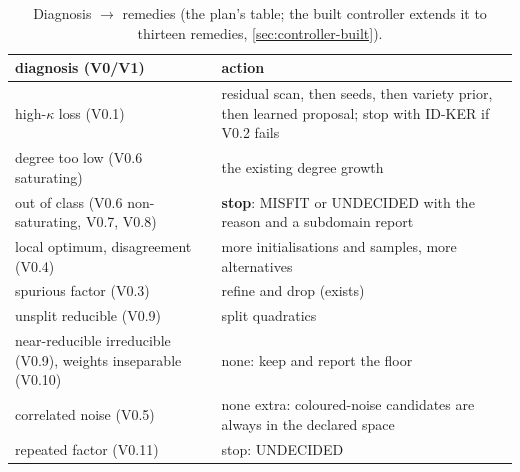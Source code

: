 \documentclass[11pt]{article}
\theoremstyle{plain}
\theoremstyle{definition}
\theoremstyle{remark}
\newcommand{\lab}[1]{\textsf{#1}}           %
\newcommand{\MIS}{\lab{MISFIT}}
\newcommand{\UND}{\lab{UNDECIDED}}
\begin{document}
\begin{table}[tbp]
\centering\small
\caption{Diagnosis $\to$ remedies (the plan's table; the built controller extends it to thirteen remedies, \cref{sec:controller-built}).}\label{tab:remedies}
\begin{tabular}{@{}p{4.3cm}p{7.4cm}@{}}
\toprule
diagnosis (V0/V1) & action\\
\midrule
high-$\kappa$ loss (V0.1) & residual scan, then seeds, then variety prior, then learned proposal; stop with ID-KER if V0.2 fails\\
degree too low (V0.6 saturating) & the existing degree growth\\
out of class (V0.6 non-saturating, V0.7, V0.8) & \textbf{stop}: \MIS{} or \UND{} with the reason and a subdomain report\\
local optimum, disagreement (V0.4) & more initialisations and samples, more alternatives\\
spurious factor (V0.3) & refine and drop (exists)\\
unsplit reducible (V0.9) & split quadratics\\
near-reducible irreducible (V0.9), weights inseparable (V0.10) & none: keep and report the floor\\
correlated noise (V0.5) & none extra: coloured-noise candidates are always in the declared space\\
repeated factor (V0.11) & stop: \UND\\
\bottomrule
\end{tabular}
\end{table}
\end{document}
